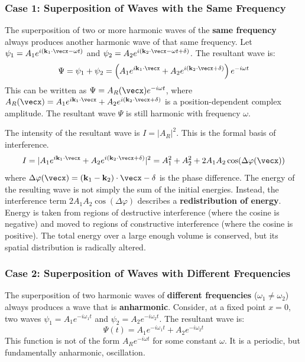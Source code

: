 \begin{definition}
\subsubsection{Case 1: Superposition of Waves with the Same Frequency}

\begin{theorem}
The superposition of two or more harmonic waves of the \textbf{same frequency} always produces another harmonic wave of that same frequency.
Let $\psi_1 = A_1 e^{i(\vecbf{k}_1 \cdot \vecx - \omega t)}$ and $\psi_2 = A_2 e^{i(\vecbf{k}_2 \cdot \vecx - \omega t + \delta)}$. The resultant wave is:
$$ \Psi = \psi_1 + \psi_2 = \left( A_1 e^{i\vecbf{k}_1 \cdot \vecx} + A_2 e^{i(\vecbf{k}_2 \cdot \vecx + \delta)} \right) e^{-i\omega t} $$
This can be written as $\Psi = A_R(\vecx)e^{-i\omega t}$, where $A_R(\vecx) = A_1 e^{i\vecbf{k}_1 \cdot \vecx} + A_2 e^{i(\vecbf{k}_2 \cdot \vecx + \delta)}$ is a position-dependent complex amplitude. The resultant wave $\Psi$ is still harmonic with frequency $\omega$.
\end{theorem}

\begin{proposition}
The intensity of the resultant wave is $I = |A_R|^2$. This is the formal basis of interference.
$$ I = |A_1 e^{i\vecbf{k}_1 \cdot \vecx} + A_2 e^{i(\vecbf{k}_2 \cdot \vecx + \delta)}|^2 = A_1^2 + A_2^2 + 2A_1 A_2 \cos(\Delta\varphi(\vecx)) $$
where $\Delta\varphi(\vecx) = (\vecbf{k}_1 - \vecbf{k}_2)\cdot\vecx - \delta$ is the phase difference.
The energy of the resulting wave is not simply the sum of the initial energies. Instead, the interference term $2A_1 A_2 \cos(\Delta\varphi)$ describes a \textbf{redistribution of energy}. Energy is taken from regions of destructive interference (where the cosine is negative) and moved to regions of constructive interference (where the cosine is positive). The total energy over a large enough volume is conserved, but its spatial distribution is radically altered.
\end{proposition}

\subsubsection{Case 2: Superposition of Waves with Different Frequencies}

\begin{theorem}
The superposition of two harmonic waves of \textbf{different frequencies} ($\omega_1 \neq \omega_2$) always produces a wave that is \textbf{anharmonic}.
Consider, at a fixed point $x=0$, two waves $\psi_1 = A_1 e^{-i\omega_1 t}$ and $\psi_2 = A_2 e^{-i\omega_2 t}$. The resultant wave is:
$$ \Psi(t) = A_1 e^{-i\omega_1 t} + A_2 e^{-i\omega_2 t} $$
This function is not of the form $A_R e^{-i\omega t}$ for some constant $\omega$. It is a periodic, but fundamentally anharmonic, oscillation.
\end{theorem}


\end{definition}
